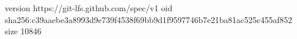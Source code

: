version https://git-lfs.github.com/spec/v1
oid sha256:c39aaebe3a8993d9e739f4538f69bb9d1f9597746b7e21ba81ac525c455af852
size 10846
